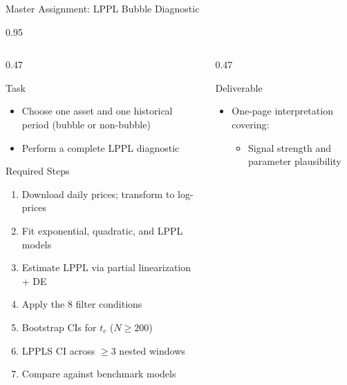 \documentclass[9pt, aspectratio=169, t]{beamer}
\begin{document}
\begin{frame}{Master Assignment: LPPL Bubble Diagnostic}
    \begin{cminipage}{0.95\textwidth}
    {\scriptsize
    \begin{columns}[T]
        \begin{column}{0.47\textwidth}
            \begin{block}{Task}
                \begin{itemize}\setlength{\itemsep}{0pt}
                    \item Choose one asset and one historical period (bubble or non-bubble)
                    \item Perform a complete LPPL diagnostic
                \end{itemize}
            \end{block}
            \vspace{-2mm}
            \begin{exampleblock}{Required Steps}
                \begin{enumerate}\setlength{\itemsep}{0pt}
                    \item Download daily prices; transform to log-prices
                    \item Fit exponential, quadratic, and LPPL models
                    \item Estimate LPPL via partial linearization + DE
                    \item Apply the 8 filter conditions
                    \item Bootstrap CIs for $t_c$ ($N \geq 200$)
                    \item LPPLS CI across $\geq 3$ nested windows
                    \item Compare against benchmark models
                \end{enumerate}
            \end{exampleblock}
        \end{column}
        \begin{column}{0.47\textwidth}
            \begin{alertblock}{Deliverable}
                \begin{itemize}\setlength{\itemsep}{0pt}
                    \item One-page interpretation covering:
                    \begin{itemize}\setlength{\itemsep}{0pt}
                        \item Signal strength and parameter plausibility

\end{itemize}
\end{itemize}
\end{alertblock}
\end{column}
\end{columns}}
\end{cminipage}
\end{frame}
\end{document}
